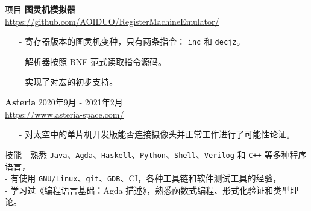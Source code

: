 \documentclass{resume} %
\newcommand{\itemsepval}{-6pt}
\newcommand{\code}{\texttt}
\begin{document}
\begin{rSection}{项目}
    \textbf{图灵机模拟器} \hfill \\ 
    \url{https://github.com/AOIDUO/RegisterMachineEmulator/} \hfill \par
    \begin{itemize}
        \itemsep \itemsepval {} 
        
        \item[-] 寄存器版本的图灵机变种，只有两条指令： \code{inc} 和 \code{decjz}。
        \item[-] 解析器按照 BNF 范式读取指令源码。 
        \item[-] 实现了对宏的初步支持。
    \end{itemize}

    \textbf{Asteria} \hfill 2020年9月 - 2021年2月  \\
    \url{https://www.asteria-space.com/} \hfill \par
    \begin{itemize}
        \itemsep \itemsepval {} 
        \item[-] 对太空中的单片机开发版能否连接摄像头并正常工作进行了可能性论证。
    \end{itemize}

\end{rSection} 

\begin{rSection}{技能}
    - 熟悉 \code{Java}、\code{Agda}、\code{Haskell}、\code{Python}、\code{Shell}、\code{Verilog} 和 \code{C++} 等多种程序语言，\\
    - 有使用 \code{GNU/Linux}、\code{git}、\code{GDB}、CI，各种工具链和软件测试工具的经验， \\
    - 学习过《编程语言基础：Agda 描述》，熟悉函数式编程、形式化验证和类型理论。 \\

\end{rSection} 
\end{document}
